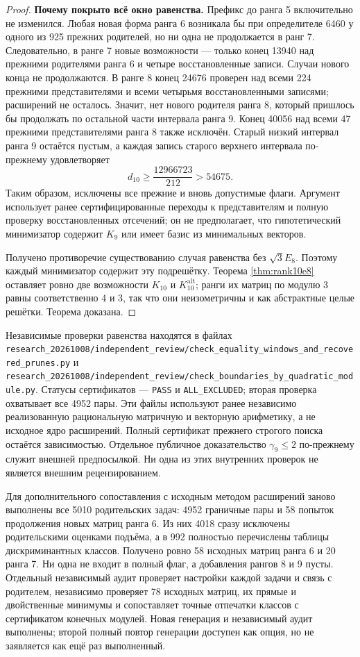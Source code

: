 \documentclass[11pt,a4paper]{article}
\theoremstyle{remark}\newtheorem{remark}[theorem]{Замечание}
\newcommand{\Kalt}{K_{10}^{\mathrm{alt}}}
\newcommand{\file}[1]{{\small\nolinkurl{#1}}}
\begin{document}
\begin{proof}
\textbf{Почему покрыто всё окно равенства.}
Префикс до ранга 5 включительно не изменился. Любая новая форма ранга 6 возникала бы при определителе 6460 у одного из 925 прежних родителей, но ни одна не продолжается в ранг 7. Следовательно, в ранге 7 новые возможности --- только конец 13940 над прежними родителями ранга 6 и четыре восстановленные записи. Случаи нового конца не продолжаются. В ранге 8 конец 24676 проверен над всеми 224 прежними представителями и всеми четырьмя восстановленными записями; расширений не осталось. Значит, нет нового родителя ранга 8, который пришлось бы продолжать по остальной части интервала ранга 9. Конец 40056 над всеми 47 прежними представителями ранга 8 также исключён. Старый низкий интервал ранга 9 остаётся пустым, а каждая запись старого верхнего интервала по-прежнему удовлетворяет
\[
d_{10}\ge\frac{12966723}{212}>54675.
\]
Таким образом, исключены все прежние и вновь допустимые флаги. Аргумент использует ранее сертифицированные переходы к представителям и полную проверку восстановленных отсечений; он не предполагает, что гипотетический минимизатор содержит $K_9$ или имеет базис из минимальных векторов.

Получено противоречие существованию случая равенства без $\sqrt3E_8$. Поэтому каждый минимизатор содержит эту подрешётку. Теорема \ref{thm:rank10e8} оставляет ровно две возможности $K_{10}$ и $\Kalt$; ранги их матриц по модулю 3 равны соответственно 4 и 3, так что они неизометричны и как абстрактные целые решётки. Теорема доказана.
\end{proof}

Независимые проверки равенства находятся в файлах \file{research_20261008/independent_review/check_equality_windows_and_recovered_prunes.py} и \file{research_20261008/independent_review/check_boundaries_by_quadratic_module.py}. Статусы сертификатов --- \file{PASS} и \file{ALL_EXCLUDED}; вторая проверка охватывает все 4952 пары. Эти файлы используют ранее независимо реализованную рациональную матричную и векторную арифметику, а не исходное ядро расширений. Полный сертификат прежнего строгого поиска остаётся зависимостью. Отдельное публичное доказательство $\gamma_9\le2$ по-прежнему служит внешней предпосылкой. Ни одна из этих внутренних проверок не является внешним рецензированием.

Для дополнительного сопоставления с исходным методом расширений заново выполнены все 5010 родительских задач: 4952 граничные пары и 58 попыток продолжения новых матриц ранга 6. Из них 4018 сразу исключены родительскими оценками подъёма, а в 992 полностью перечислены таблицы дискриминантных классов. Получено ровно 58 исходных матриц ранга 6 и 20 ранга 7. Ни одна не входит в полный флаг, а добавления рангов 8 и 9 пусты. Отдельный независимый аудит проверяет настройки каждой задачи и связь с родителем, независимо проверяет 78 исходных матриц, их прямые и двойственные минимумы и сопоставляет точные отпечатки классов с сертификатом конечных модулей. Новая генерация и независимый аудит выполнены; второй полный повтор генерации доступен как опция, но не заявляется как ещё раз выполненный.
\end{document}

